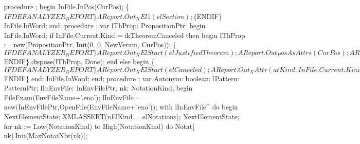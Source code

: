procedure ;
begin
   InFile.InPos(CurPos);
   \{$IFDEF ANALYZER_REPORT\}
   AReport.Out_XEl1(elSection);
   \{$ENDIF\}
   InFile.InWord;
end;
\eatline
{}\nwendcode{}\nwdocspar
\nwenddocs{}\endmoddef\nwstartdeflinemarkup{}\nwenddeflinemarkup
procedure ;
var
   lThProp: PropositionPtr;
begin
   InFile.InWord;
   if InFile.Current.Kind = ikTheoremCanceled then
   begin
      lThProp := new(PropositionPtr, Init(0, 0, NewVerum, CurPos));
      \{$IFDEF ANALYZER_REPORT\}
      AReport.Out_XElStart(elJustifiedTheorem);
      AReport.Out_PosAsAttrs(CurPos);
      AReport.Out_XAttrEnd;
      AReport.Out_Proposition(lThProp);
      AReport.Out_XEl1(elSkippedProof);
      AReport.Out_XElEnd(elJustifiedTheorem);
      \{$ENDIF\}
      dispose(lThProp, Done);
   end
   else
   begin
      \{$IFDEF ANALYZER_REPORT\}
      AReport.Out_XElStart(elCanceled);
      AReport.Out_XAttr(atKind, InFile.Current.Kind);
      AReport.Out_XElEnd0;
      \{$ENDIF\}
   end;
   InFile.InWord;
end;
\eatline
{}\nwendcode{}\nwdocspar
\nwenddocs{}\endmoddef\nwstartdeflinemarkup{}\nwenddeflinemarkup
procedure ;
var
   Antonym: boolean;
   lPattern: PatternPtr;
   lInEnvFile: InEnvFilePtr;
   nk: NotationKind;
begin
   FileExam(EnvFileName+'.eno');
   lInEnvFile := new(InEnvFilePtr,OpenFile(EnvFileName+'.eno'));
   with lInEnvFile^ do
   begin
      NextElementState;
      XMLASSERT(nElKind = elNotations);
      NextElementState;
      for nk := Low(NotationKind) to High(NotationKind) do
         Notat[ nk].Init(MaxNotatNbr(nk));
